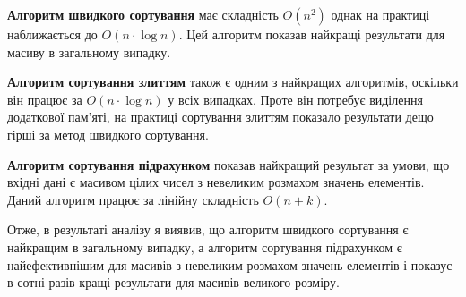 \documentclass{article}
\begin{document}
\begin{normalsize}
\begin{list}{•}{}
			\item \textbf{Алгоритм швидкого сортування} має складність $O(n^2)$ однак на практиці наближається до $O(n\cdot \log n)$. Цей алгоритм показав найкращі результати для масиву в загальному випадку.
			
			\item \textbf{Алгоритм сортування злиттям} також є одним з найкращих алгоритмів, оскільки він працює за $O(n\cdot \log n)$  у всіх випадках. Проте він потребує виділення додаткової пам’яті, на практиці сортування злиттям показало результати дещо гірші за метод швидкого сортування.
			
			\item \textbf{Алгоритм сортування підрахунком} показав найкращий результат за умови, що вхідні дані є масивом цілих чисел з невеликим розмахом значень елементів. Даний алгоритм працює за лінійну складність $O(n+k)$.
		\end{list}

		Отже, в результаті аналізу я виявив, що алгоритм швидкого сортування є найкращим в загальному випадку, а алгоритм сортування підрахунком є найефективнішим для масивів з невеликим розмахом значень елементів і показує в сотні разів кращі результати для масивів великого розміру.
		
	\end{normalsize}
\end{document}
